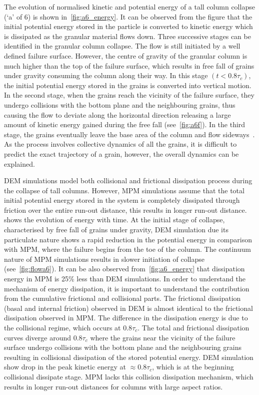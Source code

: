  
The evolution of normalised kinetic and potential energy of a tall column 
collapse (`a' of 6) is shown in~\cref{fig:a6_energy}. It can be 
observed from the figure that the initial potential energy stored in the 
particle is converted to kinetic energy which is dissipated as the granular 
material flows down. Three successive stages can be identified in the granular 
column collapse. The flow is still initiated by a well defined failure surface. 
However, the centre of gravity of the granular column is much higher than the 
top of the failure surface, which results in free fall of grains under gravity 
consuming the column along their way. In this stage 
$(t<0.8\tau_{c})$, the initial potential energy stored in the grains is 
converted into vertical motion. In the second stage, when the grains reach the 
vicinity of the failure surface, they undergo collisions with the bottom plane 
and the neighbouring grains, thus causing the flow to deviate along the 
horizontal direction releasing a large amount of kinetic energy gained during 
the free fall (see~\cref{fig:a6f}). In the third stage, the grains eventually 
leave the base area of the column and flow sideways~\citep{Lajeunesse2004}. As 
the process involves collective dynamics of all the grains, it is difficult 
to predict the exact trajectory of a grain, however, the overall dynamics can 
be explained. 


DEM simulations model both collisional and frictional dissipation process 
during the collapse of tall columns. However, MPM simulations assume that the 
total initial potential energy stored in the system is completely dissipated 
through friction over the entire run-out distance, this results in longer 
run-out distance.~ shows the evolution of energy with time. 
At the initial stage of collapse, characterised by free fall of grains under 
gravity, DEM simulation due its particulate nature shows a rapid reduction in 
the potential energy in comparison with MPM, where the failure begins from the 
toe of the column. The continuum nature of MPM simulations results in slower 
initiation of collapse (see~\cref{fig:flowa6}). It can be also observed 
from~\cref{fig:a6_energy} that dissipation energy in MPM is 25\% less than DEM 
simulations. In order to understand the mechanism of energy dissipation, it is 
important to understand the contribution from the cumulative frictional and 
collisional parts. The frictional dissipation (basal and internal friction) 
observed in DEM is almost identical to the frictional dissipation observed in 
MPM. The difference in the dissipation energy is due to the collisional regime, 
which occurs at $0.8\tau_c$. The total and frictional dissipation curves 
diverge around $0.8\tau_c$ where the grains near the vicinity of the failure 
surface undergo collisions with the bottom plane and the neighbouring grains 
resulting in collisional dissipation of the stored potential energy. DEM 
simulation show drop in the peak kinetic energy at $\approx0.8\tau_c$, which is 
at the beginning collisional dissipate stage. MPM lacks this collision 
dissipation mechanism, which results in longer run-out distances for columns 
with large aspect ratios. 

